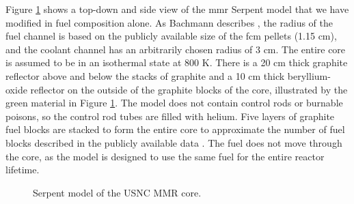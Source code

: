 Figure \ref{fig:mmr_core} shows a top-down and side view of the \gls{mmr} Serpent model \cite{bachmann_mmr_like_2023} that we have modified in fuel composition alone. As Bachmann describes \cite{bachmann_thesis_2023}, the radius of the fuel channel is based on the publicly available size of the \gls{fcm} pellets (1.15 cm), and the coolant channel has an arbitrarily chosen radius of 3 cm. The entire core is assumed to be in an isothermal state at 800 K. There is a 20 cm thick graphite reflector above and below the stacks of graphite and a 10 cm thick beryllium-oxide reflector on the outside of the graphite blocks of the core, illustrated by the green material in Figure \ref{fig:mmr_core}. The model does not contain control rods or burnable poisons, so the control rod tubes are filled with helium. Five layers of graphite fuel blocks are stacked to form the entire core to approximate the number of fuel blocks described in the publicly available data \cite{usnc_design_2021}. The fuel does not move through the core, as the model is designed to use the same fuel for the entire reactor lifetime.


\begin{figure}[H]
    \hfill
    \caption{Serpent model of the USNC MMR core.}
    \label{fig:mmr_core}
\end{figure}



